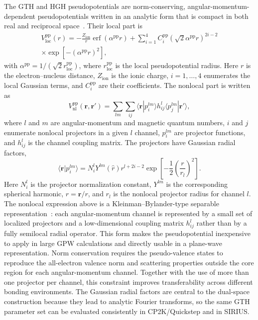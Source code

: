 \documentclass[aps,prb,reprint,amsmath,amssymb,superscriptaddress,longbibliography,floatfix]{revtex4-2}
\begin{document}
The GTH and HGH pseudopotentials are norm-conserving, angular-momentum-dependent pseudopotentials written in an analytic form that is compact in both real and reciprocal space~\cite{Goedecker1996,Hartwigsen1998}. Their local part is
\begin{multline}
V_{\mathrm{loc}}^{\mathrm{pp}}(r) =
-\frac{Z_{\mathrm{ion}}}{r}\operatorname{erf}\left(\alpha^{\mathrm{pp}} r\right)
+ \sum_{i=1}^{4} C_i^{\mathrm{pp}}
\left(\sqrt{2}\alpha^{\mathrm{pp}} r\right)^{2i-2} \\
\times \exp\left[-\left(\alpha^{\mathrm{pp}} r\right)^2\right],
\end{multline}
with $\alpha^{\mathrm{pp}}=1/(\sqrt{2}r_{\mathrm{loc}}^{\mathrm{pp}})$, where $r_{\mathrm{loc}}^{\mathrm{pp}}$ is the local pseudopotential radius. Here $r$ is the electron--nucleus distance, $Z_{\mathrm{ion}}$ is the ionic charge, $i=1,\ldots,4$ enumerates the local Gaussian terms, and $C_i^{\mathrm{pp}}$ are their coefficients. The nonlocal part is written as
\begin{equation}
V_{\mathrm{nl}}^{\mathrm{pp}}(\mathbf r,\mathbf r')
=\sum_{lm}\sum_{ij}
\langle \mathbf r|p_i^{lm}\rangle h_{ij}^{l}
\langle p_j^{lm}|\mathbf r'\rangle,
\end{equation}
where $l$ and $m$ are angular-momentum and magnetic quantum numbers, $i$ and $j$ enumerate nonlocal projectors in a given $l$ channel, $p_i^{lm}$ are projector functions, and $h_{ij}^{l}$ is the channel coupling matrix. The projectors have Gaussian radial factors,
\begin{equation}
\langle \mathbf r|p_i^{lm}\rangle =
N_i^{l}Y^{lm}(\hat r) r^{l+2i-2}
\exp\left[-\frac{1}{2}\left(\frac{r}{r_l}\right)^2\right].
\end{equation}
Here $N_i^l$ is the projector normalization constant, $Y^{lm}$ is the corresponding spherical harmonic, $\hat r=\mathbf r/r$, and $r_l$ is the nonlocal projector radius for channel $l$.
The nonlocal expression above is a Kleinman--Bylander-type separable representation~\cite{Kleinman1982}: each angular-momentum channel is represented by a small set of localized projectors and a low-dimensional coupling matrix $h_{ij}^{l}$ rather than by a fully semilocal radial operator. This form makes the pseudopotential inexpensive to apply in large GPW calculations and directly usable in a plane-wave representation. Norm conservation requires the pseudo-valence states to reproduce the all-electron valence norm and scattering properties outside the core region for each angular-momentum channel. Together with the use of more than one projector per channel, this constraint improves transferability across different bonding environments. The Gaussian radial factors are central to the dual-space construction because they lead to analytic Fourier transforms, so the same GTH parameter set can be evaluated consistently in CP2K/Quickstep and in SIRIUS.
\end{document}
